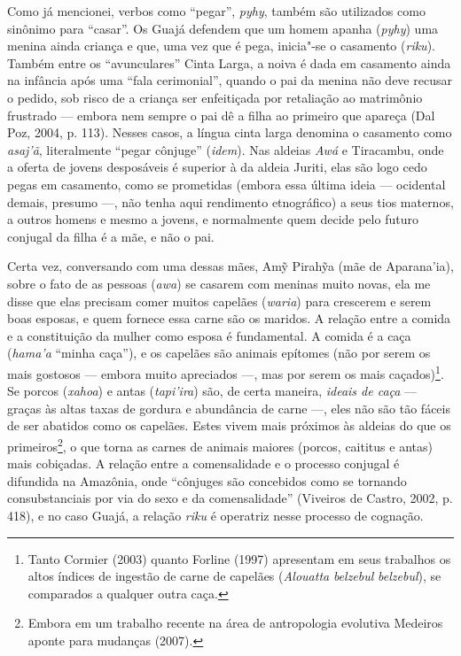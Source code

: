 Como já mencionei, verbos como ``pegar'', \emph{pyhy}, também são
utilizados como sinônimo para ``casar''. Os Guajá defendem que um homem
apanha (\emph{pyhy}) uma menina ainda criança e que, uma vez que é pega,
inicia"-se o casamento (\emph{riku}). Também entre os ``avunculares''
Cinta Larga, a noiva é dada em casamento ainda na infância após uma
``fala cerimonial'', quando o pai da menina não deve recusar o pedido, sob
risco de a criança ser enfeitiçada por retaliação ao matrimônio
frustrado --- embora nem sempre o pai dê a filha ao primeiro que apareça
(Dal Poz, 2004, p. 113). Nesses casos, a língua cinta larga denomina o
casamento como \emph{asaj'ã}, literalmente ``pegar cônjuge'' (\emph{idem}). Nas
aldeias \emph{Awá} e Tiracambu, onde a oferta de jovens desposáveis é
superior à da aldeia Juriti, elas são logo cedo pegas em casamento, como
se prometidas (embora essa última ideia --- ocidental demais, presumo ---,
não tenha aqui rendimento etnográfico) a seus tios maternos, a outros
homens e mesmo a jovens, e normalmente quem decide pelo futuro conjugal
da filha é a mãe, e não o pai.

Certa vez, conversando com uma dessas mães, Amỹ Pirahỹa (mãe de
Aparana'ia), sobre o fato de as pessoas (\emph{awa}) se casarem com
meninas muito novas, ela me disse que elas precisam comer muitos
capelães (\emph{waria}) para crescerem e serem boas esposas, e quem
fornece essa carne são os maridos. A relação entre a comida e a
constituição da mulher como esposa é fundamental. A comida é a caça
(\emph{hama'a} ``minha caça''), e os capelães são animais epítomes (não
por serem os mais gostosos --- embora muito apreciados ---, mas por serem os
mais caçados)\footnote{Tanto Cormier (2003) quanto Forline (1997)
  apresentam em seus trabalhos os altos índices de ingestão de carne de
  capelães (\emph{Alouatta} \emph{belzebul} \emph{belzebul}), se
  comparados a qualquer outra caça.}. Se porcos (\emph{xahoa}) e antas
(\emph{tapi'ira}) são, de certa maneira, \emph{ideais de caça} --- graças
às altas taxas de gordura e abundância de carne ---, eles não são tão
fáceis de ser abatidos como os capelães. Estes vivem mais próximos às
aldeias do que os primeiros\footnote{Embora em um trabalho recente na
  área de antropologia evolutiva Medeiros aponte para mudanças (2007).},
o que torna as carnes de animais maiores (porcos, caititus e antas) mais
cobiçadas. A relação entre a comensalidade e o processo conjugal é
difundida na Amazônia, onde ``cônjuges são concebidos como se tornando
consubstanciais por via do sexo e da comensalidade'' (Viveiros de Castro,
2002, p. 418), e no caso Guajá, a relação \emph{riku} é operatriz nesse
processo de cognação.

